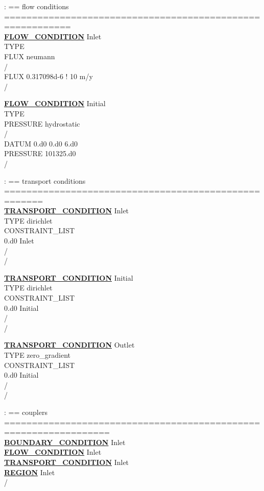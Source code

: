 \noindent
: == flow conditions ==========================================================\\
\hyperlink{target_flow_cond}{\bf FLOW\_CONDITION} Inlet\\
TYPE\\
FLUX neumann\\
/\\
FLUX 0.317098d-6 ! 10 m/y\\
/

\noindent
\hyperlink{target_flow_cond}{\bf FLOW\_CONDITION} Initial\\
TYPE\\
PRESSURE hydrostatic\\
/\\
DATUM 0.d0 0.d0 6.d0\\
PRESSURE 101325.d0\\
/

\noindent
: == transport conditions =====================================================\\
\hyperlink{target_trans_cond}{\bf TRANSPORT\_CONDITION} Inlet\\
TYPE dirichlet\\
CONSTRAINT\_LIST\\
0.d0 Inlet\\
/\\
/

\noindent
\hyperlink{target_trans_cond}{\bf TRANSPORT\_CONDITION} Initial\\
TYPE dirichlet\\
CONSTRAINT\_LIST\\
0.d0 Initial\\
/\\
/

\noindent
\hyperlink{target_trans_cond}{\bf TRANSPORT\_CONDITION} Outlet\\
TYPE zero\_gradient\\
CONSTRAINT\_LIST\\
0.d0 Initial\\
/\\
/

\noindent
: == couplers =================================================================\\
\hyperlink{target_bcon}{\bf BOUNDARY\_CONDITION} Inlet\\
\hyperlink{target_flow_cond}{\bf FLOW\_CONDITION} Inlet\\
\hyperlink{target_trans_cond}{\bf TRANSPORT\_CONDITION} Inlet\\
\hyperlink{target_region}{\bf REGION} Inlet\\
/

